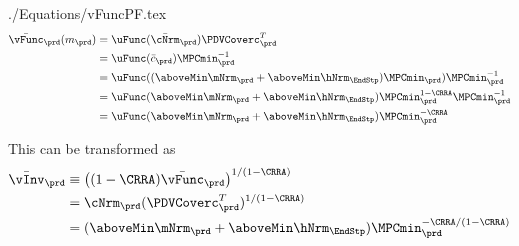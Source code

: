 \documentclass[\econtexRoot/SolvingMicroDSOPs]{subfiles}
\begin{document}
\begin{verbatimwrite}{./Equations/vFuncPF.tex}
  \begin{equation}\begin{gathered}\begin{aligned}
        \bar{\vFunc}_{\prd}(m_{\prd})  & = \uFunc(\bar{\cNrm}_{\prd})\PDVCoverc_{\prd}^{T}\label{eq:vFuncPF}
        \\  & = \uFunc(\bar{c}_{\prd}) \MPCmin_{\prd}^{-1} %
        \\  & = \uFunc((\aboveMin \mNrm_{\prd}+\aboveMin \hNrm_{\EndStp})\MPCmin_{\prd}) \MPCmin_{\prd}^{-1} %
        \\  & = \uFunc(\aboveMin \mNrm_{\prd}+\aboveMin \hNrm_{\EndStp})\MPCmin_{\prd}^{1-\CRRA} \MPCmin_{\prd}^{-1} %
        \\  & = \uFunc(\aboveMin \mNrm_{\prd}+\aboveMin \hNrm_{\EndStp})\MPCmin_{\prd}^{-\CRRA}  %
      \end{aligned}\end{gathered}\end{equation}

  This can be transformed as
  \begin{equation*}\begin{gathered}\begin{aligned}
        \bar{\vInv}_{\prd}  & \equiv  \left((1-\CRRA)\bar{\vFunc}_{\prd}\right)^{1/(1-\CRRA)}
        \\  & = \cNrm_{\prd}(\PDVCoverc_{\prd}^{T})^{1/(1-\CRRA)}
        \\  & = (\aboveMin \mNrm_{\prd}+\aboveMin \hNrm_{\EndStp})\MPCmin_{\prd}^{-\CRRA/(1-\CRRA)}   %
      \end{aligned}\end{gathered}\end{equation*}
\end{verbatimwrite}
\unskip
\end{document}
